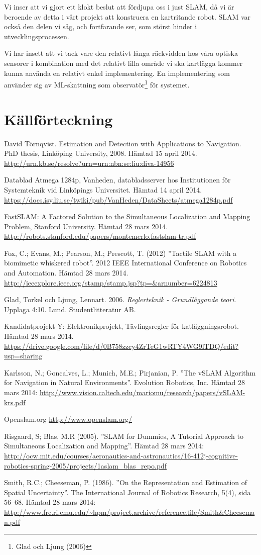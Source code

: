 \documentclass[a4paper,12pt,fleqn]{article}
\begin{document}
Vi inser att vi gjort ett klokt beslut att fördjupa oss i just SLAM, då vi är beroende av detta i vårt projekt att konstruera en kartritande robot. SLAM var också den delen vi såg, och fortfarande ser, som störst hinder i utvecklingsprocessen. 

Vi har insett att vi tack vare den relativt långa räckvidden hos våra optiska sensorer i kombination med det relativt lilla område vi ska kartlägga kommer kunna använda en relativt enkel implementering. En implementering som använder sig av ML-skattning som observatör\footnote{Glad och Ljung (2006)} för systemet. 

\newpage 
\section*{Källförteckning} 

David Törnqvist. Estimation and Detection with Applications to Navigation. PhD thesis, Linköping University, 2008. Hämtad 15 april 2014.
\url{http://urn.kb.se/resolve?urn=urn:nbn:se:liu:diva-14956}

Datablad Atmega 1284p, Vanheden, databladsserver hos Institutionen för Systemteknik vid Linköpings Universitet. Hämtad 14 april 2014. \url{https://docs.isy.liu.se/twiki/pub/VanHeden/DataSheets/atmega1284p.pdf}

FastSLAM: A Factored Solution to the Simultaneous
Localization and Mapping Problem, Stanford University. Hämtad 28 mars 2014.
\url{http://robots.stanford.edu/papers/montemerlo.fastslam-tr.pdf}

Fox, C.; Evans, M.; Pearson, M.; Prescott, T. (2012)
''Tactile SLAM with a biomimetic whiskered robot''. 2012 IEEE International Conference on Robotics and Automation. Hämtad 28 mars 2014.
\url{http://ieeexplore.ieee.org/stamp/stamp.jsp?tp=&arnumber=6224813}

Glad, Torkel och Ljung, Lennart. 2006. \textit{Reglerteknik - Grundläggande teori}. Upplaga 4:10. Lund. Studentlitteratur AB.

Kandidatprojekt Y: Elektronikprojekt, Tävlingsregler för katläggningsrobot. Hämtad 28 mars 2014.  \url{https://drive.google.com/file/d/0B758zzcy4ZrTeG1wRTY4WG9lTDQ/edit?usp=sharing}

Karlsson, N.; Goncalves, L.; Munich, M.E.; Pirjanian, P.
''The vSLAM Algorithm for Navigation in Natural Environments''. Evolution Robotics, Inc. Hämtad 28 mars 2014:
\url{http://www.vision.caltech.edu/mariomu/research/papers/vSLAM-krs.pdf}

Openslam.org
\url{http://www.openslam.org/}

Risgaard, S; Blas, M.R (2005).
''SLAM for Dummies, A Tutorial Approach to Simultaneous Localization and Mapping''. 
Hämtad 28 mars 2014:
\url{http://ocw.mit.edu/courses/aeronautics-and-astronautics/16-412j-cognitive-robotics-spring-2005/projects/1aslam_blas_repo.pdf}

Smith, R.C.; Cheeseman, P. (1986). ''On the Representation and Estimation of Spatial Uncertainty''. The
International Journal of Robotics Research, 5(4), sida 56–68. Hämtad
28 mars 2014:
\url{http://www.frc.ri.cmu.edu/~hpm/project.archive/reference.file/Smith&Cheeseman.pdf}
\end{document}
